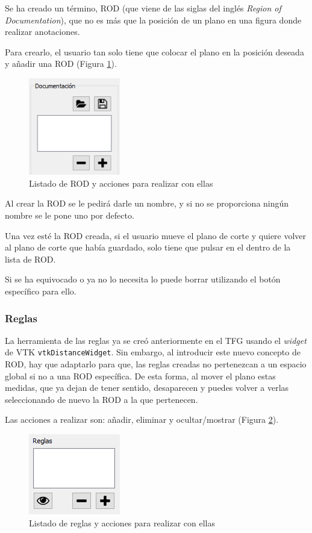 Se ha creado un término, ROD (que viene de las siglas del inglés \textit{Region of Documentation}), que no es más que la posición de un plano en una figura donde realizar anotaciones.

Para crearlo, el usuario tan solo tiene que colocar el plano en la posición deseada y añadir una ROD (Figura \ref{fig:desarrollo/gui-rod}).

\begin{figure}[H]
	\centering
	\includegraphics[width=4cm]{imagenes/desarrollo/gui-rod}
	\caption{Listado de ROD y acciones para realizar con ellas}
	\label{fig:desarrollo/gui-rod}
\end{figure}

Al crear la ROD se le pedirá darle un nombre, y si no se proporciona ningún nombre se le pone uno por defecto.

Una vez esté la ROD creada, si el usuario mueve el plano de corte y quiere volver al plano de corte que había guardado, solo tiene que pulsar en el dentro de la lista de ROD.

Si se ha equivocado o ya no lo necesita lo puede borrar utilizando el botón específico para ello.

\subsubsection{Reglas}

La herramienta de las reglas ya se creó anteriormente en el TFG usando el \textit{widget} de VTK \texttt{vtkDistanceWidget}. Sin embargo, al introducir este nuevo concepto de ROD, hay que adaptarlo para que, las reglas creadas no pertenezcan a un espacio global si no a una ROD específica. De esta forma, al mover el plano estas medidas, que ya dejan de tener sentido, desaparecen y puedes volver a verlas seleccionando de nuevo la ROD a la que pertenecen.

Las acciones a realizar son: añadir, eliminar y ocultar/mostrar (Figura \ref{fig:desarrollo/gui-reglas}).

\begin{figure}[H]
	\centering
	\includegraphics[width=4cm]{imagenes/desarrollo/gui-reglas}
	\caption{Listado de reglas y acciones para realizar con ellas}
	\label{fig:desarrollo/gui-reglas}
\end{figure}


